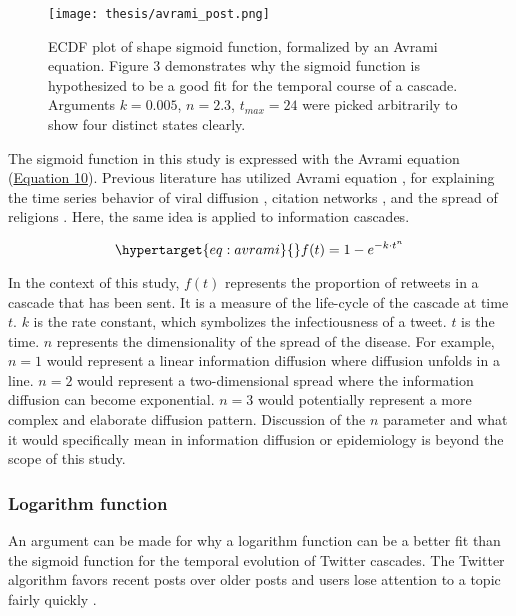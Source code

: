 \documentclass[11pt,a4paper]{article}
\begin{document}
        \begin{figure}[H]
            \hypertarget{fig:sigmoid}{}
            \centering
            \texttt{[image: thesis/avrami\_post.png]}\\
            \caption{ECDF plot of shape sigmoid function, formalized by an Avrami equation. Figure 3 demonstrates why the sigmoid function is hypothesized to be a good fit for the temporal course of a cascade. Arguments $k = 0.005$, $n = 2.3$, $t_{max} = 24$ were picked arbitrarily to show four distinct states clearly.}
            \label{fig:enter-label}
        \end{figure}
        
        The sigmoid function in this study is expressed with the Avrami equation (\hyperlink{eq:avrami}{Equation 10}). Previous literature  has utilized Avrami equation \cite{shirzad_critical_2023}, for explaining the time series behavior of viral diffusion \cite{avramov_kinetics_2007}, citation networks \cite{sangwal_comparison_2021}, and the spread of religions \cite{ausloos_statistical_2007}. Here, the same idea is applied to information cascades.
        
        \begin{equation}
            \hypertarget{eq:avrami}{}
            f(t) = 1 - e^{-k \cdot t^n}
        \end{equation}

        In the context of this study, $f(t)$ represents the proportion of retweets in a cascade that has been sent. It is a measure of the life-cycle of the cascade at time $t$. $k$ is the rate constant, which symbolizes the infectiousness of a tweet.  $t$ is the time. $n$ represents the dimensionality of the spread of the disease. For example, $n=1$ would represent a linear information diffusion where diffusion unfolds in a line. $n=2$ would represent a two-dimensional spread where the information diffusion can become exponential. $n=3$ would potentially represent a more complex and elaborate diffusion pattern. Discussion of the $n$ parameter and what it would specifically mean in information diffusion or epidemiology is beyond the scope of this study.
        
        \subsubsection{Logarithm function}
        An argument can be made for why a logarithm function can be a better fit than the sigmoid function for the temporal evolution of Twitter cascades. The Twitter algorithm favors recent posts over older posts \cite{twitter_inc_twitters_2023} and users lose attention to a topic fairly quickly \cite{lorenz-spreen_accelerating_2019}.
        
\end{document}
